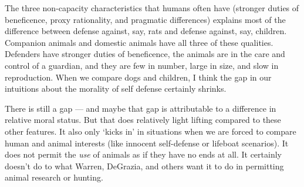 	The three non-capacity characteristics that humans often have (stronger
	duties of beneficence, proxy rationality, and pragmatic differences)
	explains most of the difference between defense against, say, rats and
	defense against, say, children.  Companion animals and domestic animals
	have all three of these qualities.  Defenders have stronger duties of
	beneficence, the animals are in the care and control of a guardian, and
	they are few in number, large in size, and slow in reproduction. When we
	compare dogs and children, I think the gap in our intuitions about the
	morality of self defense certainly shrinks.

	There is still a gap --- and maybe that gap is attributable to a difference
	in relative moral status. But that does relatively light lifting compared
	to these other features. It also only ‘kicks in’ in situations when we are
	forced to compare human and animal interests (like innocent self-defense or
	lifeboat scenarios). It does not permit the \emph{use} of animals as if
	they have no ends at all.  It certainly doesn’t do to what Warren,
	DeGrazia, and others want it to do in permitting animal research or
	hunting.
